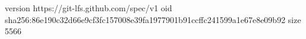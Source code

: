 version https://git-lfs.github.com/spec/v1
oid sha256:86e190c32d66e9cf3fc157008e39fa1977901b91ccffc241599a1e67e8e09b92
size 5566
